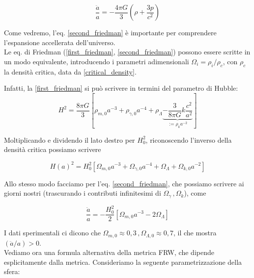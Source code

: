 \documentclass{report}
\begin{document}
\begin{tcolorbox}[colback=gray!15, colframe=black, boxrule=1pt]
\begin{equation}
    \label{second_friedman}
    \frac{\ddot{a}}{a} = -\frac{4\pi G}{3}\left(\rho + \frac{3p}{c^2} \right)
\end{equation}
\end{tcolorbox}

Come vedremo, l'eq. \ref{second_friedman} è importante per comprendere l'espansione accellerata dell'universo. \\
Le eq. di Friedman (\ref{first_friedman}, \ref{second_friedman}) possono essere scritte in un modo equivalente, introducendo i parametri adimensionali $\Omega_i = \rho_i/\rho_c$, con $\rho_c$ la densità critica, data da \ref{critical_density}. 

Infatti, la \ref{first_friedman} si può scrivere in termini del parametro di Hubble: 
\begin{equation}
    H^2 = \frac{8\pi G}{3}\left[\rho_{m, 0}a^{-3} +  \rho_{\gamma, 0}a^{-4} + \rho_\Lambda  \underbrace{- \frac{3}{8\pi G}k\frac{c^2}{a^2}}_{:= \rho_ka^{-2}}\right]
\end{equation}

Moltiplicando e dividendo il lato destro per $H_0^2$, riconoscendo l'inverso della densità critica possiamo scrivere 

\begin{equation}
    H(a)^2 = H_0^2\left[\Omega_{m,0}a^{-3} + \Omega_{\gamma,0}a^{-4} + \Omega_{\Lambda} + \Omega_{k,0}a^{-2}\right]
\end{equation}

Allo stesso modo facciamo per l'eq. \ref{second_friedman}, che possiamo scrivere ai giorni nostri (trascurando i contributi infinitesimi di $\Omega_\gamma \, , \Omega_k$), come 

\begin{equation}
    \frac{\ddot{a}}{a} = - \frac{H_0^2}{2}\left[\Omega_{m, 0}a^{-3}  - 2\Omega_{\Lambda}\right]
\end{equation}

I dati sperimentali ci dicono che $\Omega_{m,0} \approx 0,3 \, , \Omega_{\Lambda,0} \approx 0,7$, il che mostra $(\ddot{a}/a) > 0$. \\

Vediamo ora una formula alternativa della metrica FRW, che dipende esplicitamente dalla metrica. Consideriamo la seguente parametrizzazione della sfera: 
\end{document}
